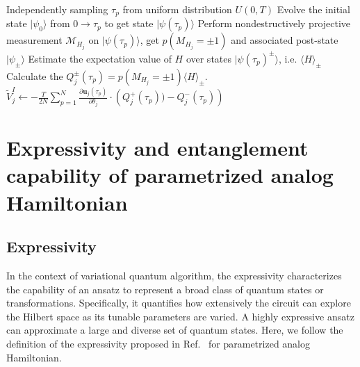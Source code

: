 \documentclass[twocolumn,
pra,aps,superscriptaddress,showpacs,amsmath,amssymb]{revtex4-2}
\begin{document}
\IncMargin{1em}
\begin{algorithm}
\BlankLine
	{
		Independently sampling $\tau_p$ from uniform distribution $U(0,T)$\;
		Evolve the initial state $|\psi_0\rangle$ from $0\rightarrow \tau_p$ to get state $|\psi(\tau_p)\rangle$\;
		Perform nondestructively projective measurement $\mathcal{M}_{H_j}$ on $|\psi(\tau_p)\rangle$, get $p(M_{H_j}=\pm 1)$ and associated post-state $|\psi_{\pm}\rangle$\;
		Estimate the expectation value of $H$ over states $|\psi(\tau_p)^{\pm}\rangle$, i.e. $\langle H \rangle_{\pm}$\;
		Calculate the $Q_{j}^{\pm}(\tau_p) = p(M_{H_j}=\pm1)\langle H\rangle_{\pm}$.
	}
$\tilde{V}_{j}^I \leftarrow -\frac{T}{2N}\sum_{p=1}^N \frac{\partial{\bm{u}_j}(\tau_p)}{\partial{\theta_j}} \cdot \left(Q_{j}^{+}(\tau_p)) - Q_{j}^{-}(\tau_p)\right)$
\caption{Estimating matrix $V_{j}^I$}\label{algo_VR}\DecMargin{1em}
\end{algorithm}\DecMargin{1em}


\section{Expressivity and entanglement capability of parametrized analog Hamiltonian}

\subsection{Expressivity}
In the context of variational quantum algorithm, the expressivity characterizes the capability of an ansatz to represent a broad class of quantum states or transformations. Specifically, it quantifies how extensively the circuit can explore the Hilbert space as its tunable parameters are varied. A highly expressive ansatz can approximate a large and diverse set of quantum states. Here, we follow the definition of the expressivity proposed in Ref.~\cite{sim2019expressibility} for parametrized analog Hamiltonian.
\end{document}
